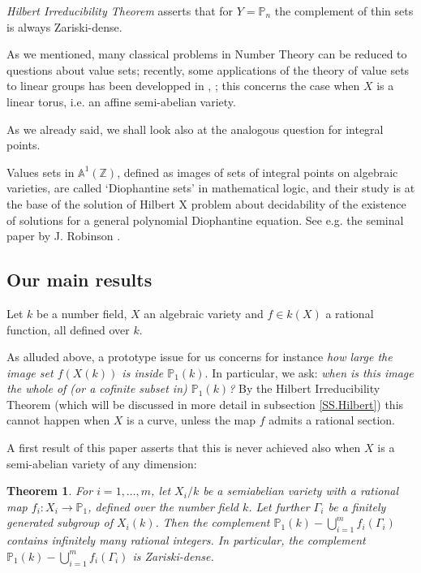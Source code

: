 \documentclass[leqno,12pt]{article} %
\def\A{{{\mathbb A}}}
\def\Z{{{\mathbb Z}}}
\def\P{{{\mathbb P}}}
\theoremstyle{plain} %
\newtheorem{theorem}{\indent\sc Theorem}[section]
\theoremstyle{definition} %
\begin{document}
 {\it Hilbert Irreducibility Theorem}  asserts that for $Y=\P_n$  the complement of thin sets is always Zariski-dense.

\smallskip

As we mentioned, many classical problems in Number Theory can be reduced to questions about value sets; recently, some  applications of the theory of value sets  to linear groups has been developped in \cite{CDRRZ}, \cite{CDRRZ2}; this concerns the case when $X$ is a linear torus, i.e. an affine semi-abelian variety.


\smallskip

\smallskip

As we already said, we shall look also at the analogous question for integral points.  

Values sets in $\A^1(\Z)$, defined as images of sets of  integral points on algebraic varieties, are called `Diophantine sets' in mathematical logic, and their study is at the base of the solution of Hilbert X problem about decidability of the existence of solutions for a general polynomial Diophantine equation. See e.g. the seminal paper by J. Robinson \cite{Rob}.

\medskip

\subsection{ Our main results}  Let $k$ be a number field, $X$ an algebraic variety and $f\in k(X)$ a rational function, all defined over $k$. 

 As alluded above, a prototype issue  for us concerns  for instance  {\it how large the  image set $f(X(k))$ is inside $\P_1(k)$}. In particular, we ask:  {\it when is this image the whole of (or a cofinite subset in) $\P_1(k)$?} By the Hilbert Irreducibility Theorem (which will be discussed in more  detail in subsection \ref{SS.Hilbert}) this cannot happen when $X$ is a curve, unless the map $f$ admits a rational section.
 
 A first result of this paper asserts that   this is never achieved also when $X$ is a semi-abelian variety of any dimension:
 
\begin{theorem}\label{T.Main}   For $i=1,\ldots , m$, let $X_i/k$ be a semiabelian variety with a rational map  $f_i:X_i\to \P_1$,    defined over the number field $k$. Let further $\Gamma_i$ be a finitely generated subgroup of $X_i(k)$. Then the complement $\P_1(k)-\bigcup_{i=1}^mf_i(\Gamma_i)$  contains infinitely many rational integers. In particular,   the complement $\P_1(k)-\bigcup_{i=1}^mf_i(\Gamma_i)$   is Zariski-dense.  

 
\end{theorem}
\end{document}
